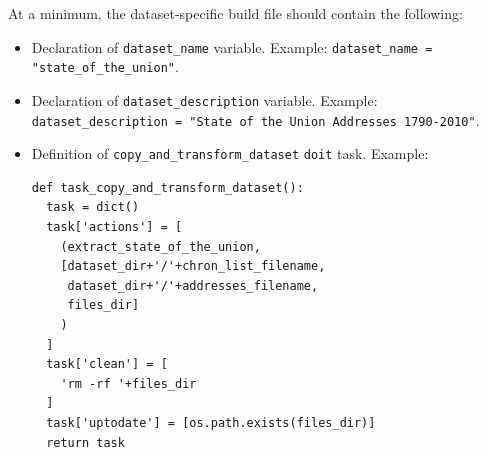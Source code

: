 \documentclass[a4paper,10pt]{article}
\begin{document}
At a minimum, the dataset-specific build file should contain the following:
\begin{itemize}
 \item Declaration of \verb/dataset_name/ variable.
   \newline Example: \verb/dataset_name = "state_of_the_union"/.
 \item Declaration of \verb/dataset_description/ variable.
   \newline Example: \verb/dataset_description = "State of the Union Addresses 1790-2010"/.
 \item Definition of \verb/copy_and_transform_dataset/ \verb/doit/ task. Example:
\begin{verbatim}
def task_copy_and_transform_dataset():
  task = dict()
  task['actions'] = [
    (extract_state_of_the_union,
    [dataset_dir+'/'+chron_list_filename,
     dataset_dir+'/'+addresses_filename,
     files_dir]
    )
  ]
  task['clean'] = [
    'rm -rf '+files_dir
  ]
  task['uptodate'] = [os.path.exists(files_dir)]
  return task
\end{verbatim}

\end{itemize}
\end{document}
